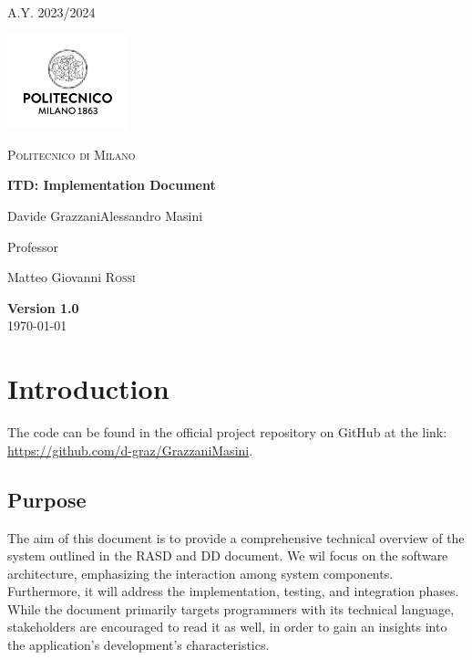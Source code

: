 \documentclass[table, 12pt]{article}
\begin{document}
\begin{titlepage}
    \centering
    {\scshape\large A.Y. 2023/2024 \par}
    \vfill
    \includegraphics[width=100pt]{assets/logo_polimi.jpg}\par\vspace{1cm}
    {\scshape\LARGE Politecnico di Milano \par}
    \vspace{1.5cm}
    {\huge\bfseries ITD\@: Implementation Document \par}
    \vspace{2cm}
    {\Large {Davide Grazzani\quad Alessandro Masini}\par}
    \vfill
    {\large Professor\par
        Matteo Giovanni \textsc{Rossi}}
    \vfill
    {\large \textbf{Version 1.0}\\ \today \par}
\end{titlepage}


\thispagestyle{plain}
\mbox{}
\newpage
{}
\tableofcontents
\newpage
{}

\section{Introduction}
The code can be found in the official project repository on GitHub at the link:
\url{https://github.com/d-graz/GrazzaniMasini}.

\subsection{Purpose}

The aim of this document is to provide a comprehensive technical overview of the system outlined in the RASD and DD document. 
We wil focus on the software architecture, emphasizing the interaction among system components. 
Furthermore, it will address the implementation, testing, and integration phases. 
While the document primarily targets programmers with its technical language, stakeholders are encouraged to read it as well, in order to gain an insights into the application's development's characteristics.
\end{document}
